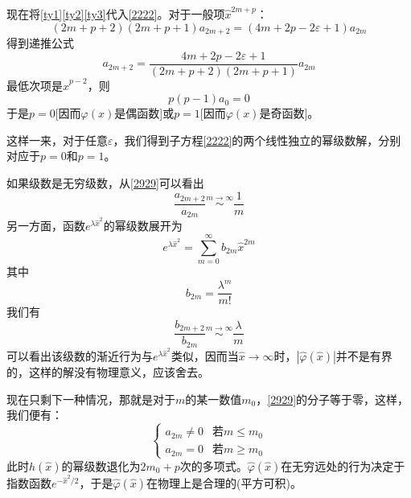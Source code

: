 \documentclass[]{article}
\begin{document}
现在将\eqref{ty1}\eqref{ty2}\eqref{ty3}代入\eqref{2222}。对于一般项$\widehat{x}^{2m+p}$：
\begin{equation}
	(2m+p+2)(2m+p+1)a_{2m+2}=(4m+2p-2\varepsilon+1)a_{2m}
\end{equation}
得到递推公式
\begin{equation}
	a_{2m+2}=\dfrac{4m+2p-2\varepsilon+1}{(2m+p+2)(2m+p+1)}a_{2m}
	\label{2929}
\end{equation}
最低次项是$\widehat{x}^{p-2}$，则
\begin{equation}
	p(p-1)a_0=0
\end{equation}
于是$p=0$[因而$\varphi(x)$是偶函数]或$p=1$[因而$\varphi(x)$是奇函数]。\par 
这样一来，对于任意$\varepsilon$，我们得到子方程\eqref{2222}的两个线性独立的幂级数解，分别对应于$p=0$和$p=1$。\par 
如果级数是无穷级数，从\eqref{2929}可以看出
\begin{equation}
	\dfrac{a_{2m+2}}{a_{2m}}\overset{m\rightarrow\infty}{\sim}\dfrac{1}{m}
\end{equation}
另一方面，函数$e^{\lambda\widehat{x}^2}$的幂级数展开为
\begin{equation}
	e^{\lambda\widehat{x}^2}=\sum\limits_{m=0}^{\infty}b_{2m}\widehat{x}^{2m}
\end{equation}
其中
\begin{equation}
	b_{2m}=\dfrac{\lambda^m}{m!}
\end{equation}
我们有
\begin{equation}
	\dfrac{b_{2m+2}}{b_{2m}}\overset{m\rightarrow\infty}{\sim}\dfrac{\lambda}{m}
\end{equation}
可以看出该级数的渐近行为与$e^{\lambda\widehat{x}^2}$类似，因而当$\widehat{x}\rightarrow\infty$时，$|\widehat{\varphi}(\widehat{x})|$并不是有界的，这样的解没有物理意义，应该舍去。\par 
现在只剩下一种情况，那就是对于$m$的某一数值$m_0$，\eqref{2929}的分子等于零，这样，我们便有：
\begin{equation}
	\begin{cases}
		a_{2m}\neq0& \text{若$m\leqslant m_0$}\\
		a_{2m}=0   & \text{若$m\geqslant m_0$}
	\end{cases}
\end{equation}
此时$h(\widehat{x})$的幂级数退化为$2m_0+p$次的多项式。$\widehat{\varphi}(\widehat{x})$在无穷远处的行为决定于指数函数$e^{-\widehat{x}^2/2}$，于是$\widehat{\varphi}(\widehat{x})$在物理上是合理的(平方可积)。\par 
\end{document}
